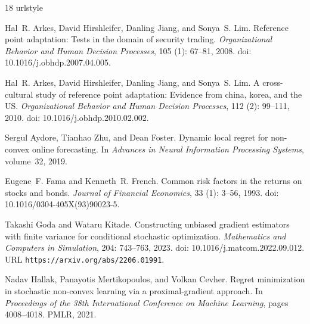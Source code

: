 \documentclass[11pt]{article}
\newcommand{\1}{\mathbf 1}
\theoremstyle{definition}
\begin{document}
\clearpage
\begin{thebibliography}{18}
\providecommand{\natexlab}[1]{#1}
\providecommand{\url}[1]{\texttt{#1}}
\expandafter\ifx\csname urlstyle\endcsname\relax
  \providecommand{\doi}[1]{doi: #1}\else
  \providecommand{\doi}{doi: \begingroup \urlstyle{rm}\Url}\fi

Hal~R. Arkes, David Hirshleifer, Danling Jiang, and Sonya~S. Lim.
\newblock Reference point adaptation: Tests in the domain of security trading.
\newblock \emph{Organizational Behavior and Human Decision Processes},
  105 (1): 67--81, 2008.
\newblock \doi{10.1016/j.obhdp.2007.04.005}.

Hal~R. Arkes, David Hirshleifer, Danling Jiang, and Sonya~S. Lim.
\newblock A cross-cultural study of reference point adaptation: Evidence from
  china, korea, and the {US}.
\newblock \emph{Organizational Behavior and Human Decision Processes},
  112 (2): 99--111, 2010.
\newblock \doi{10.1016/j.obhdp.2010.02.002}.

Sergul Aydore, Tianhao Zhu, and Dean Foster.
\newblock Dynamic local regret for non-convex online forecasting.
\newblock In \emph{Advances in Neural Information Processing Systems},
  volume~32, 2019.

Eugene~F. Fama and Kenneth~R. French.
\newblock Common risk factors in the returns on stocks and bonds.
\newblock \emph{Journal of Financial Economics}, 33 (1):
  3--56, 1993.
\newblock \doi{10.1016/0304-405X(93)90023-5}.

Takashi Goda and Wataru Kitade.
\newblock Constructing unbiased gradient estimators with finite variance for
  conditional stochastic optimization.
\newblock \emph{Mathematics and Computers in Simulation}, 204:
  743--763, 2023.
\newblock \doi{10.1016/j.matcom.2022.09.012}.
\newblock URL \url{https://arxiv.org/abs/2206.01991}.

Nadav Hallak, Panayotis Mertikopoulos, and Volkan Cevher.
\newblock Regret minimization in stochastic non-convex learning via a
  proximal-gradient approach.
\newblock In \emph{Proceedings of the 38th International Conference on Machine
  Learning}, pages 4008--4018. PMLR, 2021.


\end{thebibliography}
\end{document}
